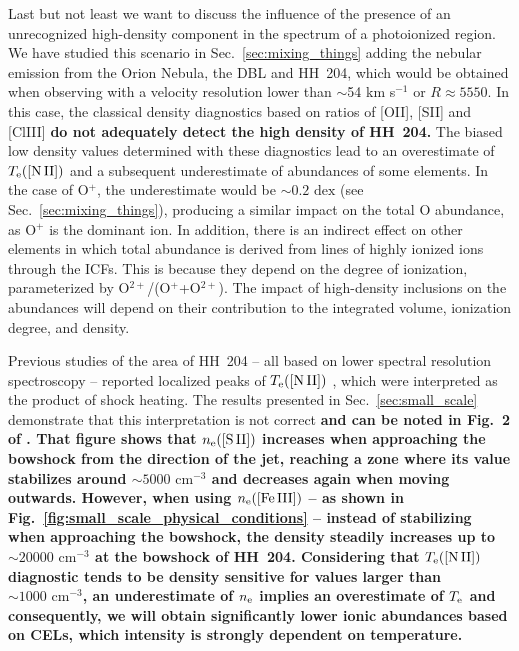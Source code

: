 \documentclass[twocolumn,linenumbers]{aastex63}
\begin{document}
Last but not least we want to discuss the influence of the presence of an unrecognized high-density component in the spectrum of a photoionized region. We have studied this scenario in Sec.~\ref{sec:mixing_things} adding the nebular emission from the Orion Nebula, the DBL and HH~204, which would be obtained when observing with a velocity resolution  lower than $\sim$54 km s$^{-1}$ or $R \approx 5550$. 
In this case, the classical density diagnostics based on ratios of [O\thinspace II], [S\thinspace II] and [Cl\thinspace III] {\bf do not adequately detect the high density of HH~204.} The biased low density values determined with these diagnostics lead to an overestimate of $T_{\rm e}(\text{[N\thinspace II]})$ and a subsequent underestimate of abundances of some elements. 
In the case of O$^{+}$, the underestimate would be $\sim 0.2 \text{ dex}$ (see Sec.~\ref{sec:mixing_things}), producing a similar impact on the total O abundance, as O$^{+}$ is the dominant ion. 
In addition, there is an indirect effect on other elements in which total abundance is derived from lines of highly ionized ions through the ICFs.
This is because they depend on the degree of ionization, parameterized by   O$^{2+}$/(O$^{+}$+O$^{2+}$). 
The impact of high-density inclusions on the abundances will depend on their contribution to the integrated volume, ionization degree, and density.

Previous studies of the area of HH~204 -- all based on lower spectral resolution spectroscopy -- reported localized peaks of $T_{\rm e}(\text{[N\thinspace II]})$ \citep{mesadelgado08,nunezdiaz12,odell17}, which were interpreted as the product of shock heating. 
The results presented in  Sec.~\ref{sec:small_scale} demonstrate that this interpretation is not correct {\bf and can be noted in Fig.~2 of \citet{odell17}. That figure shows that $n_{\rm e}(\text{[S\thinspace II]})$ increases when  approaching the bowshock from the direction of the jet, reaching a zone where its value stabilizes around $\sim 5000\text{ cm}^{-3}$ and decreases again when moving outwards. However, when using $n_{\rm e}(\text{[Fe\thinspace III]})$ -- as shown in Fig.~\ref{fig:small_scale_physical_conditions} --  instead of stabilizing when approaching the bowshock, the density steadily increases up to $\sim 20000 \text{ cm}^{-3}$ at the bowshock of HH~204. Considering that $T_{\rm e}(\text{[N\thinspace II]})$ diagnostic tends to be density sensitive for values larger than $\sim 1000 \text{ cm}^{-3}$, an underestimate of $n_{\rm e}$ implies an overestimate of $T_{\rm e}$ and consequently, we will obtain significantly lower ionic abundances based on CELs, which intensity is strongly dependent on temperature.}
\end{document}
